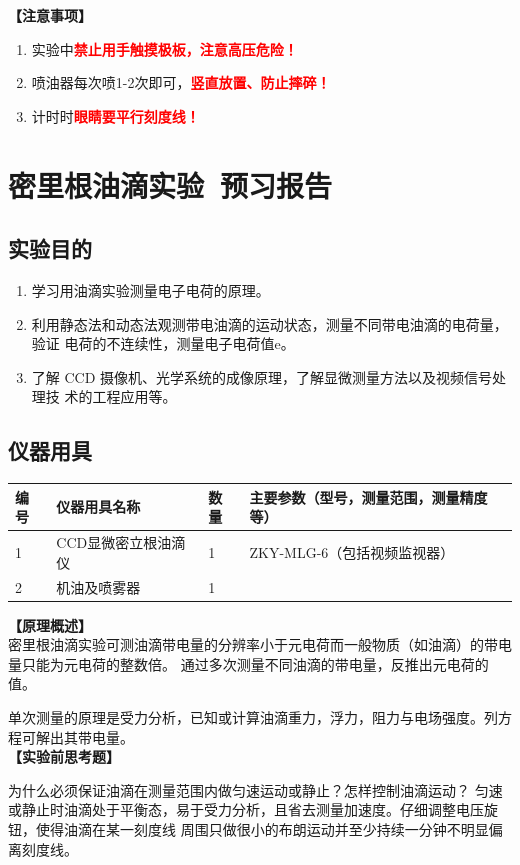 \documentclass[dvipsnames, svgnames,a4paper,11pt]{article}
\begin{document}
{\textbf{【注意事项】}
\begin{enumerate}
	\item 实验中\textbf{\textcolor{red}{禁止用手触摸极板，注意高压危险！}}
	\item 喷油器每次喷1-2次即可，\textbf{\textcolor{red}{竖直放置、防止摔碎！}}
	\item 计时时\textbf{\textcolor{red}{眼睛要平行刻度线！}}
    
\end{enumerate}}

\clearpage
\tableofcontents
\clearpage

\setcounter{section}{0}
\section{密里根油滴实验\ \textbf{预习报告}}
	
\subsection{实验目的}
\begin{enumerate}
	\item 学习用油滴实验测量电子电荷的原理。
	\item 利用静态法和动态法观测带电油滴的运动状态，测量不同带电油滴的电荷量，验证
	电荷的不连续性，测量电子电荷值e。 
	\item 了解 CCD 摄像机、光学系统的成像原理，了解显微测量方法以及视频信号处理技
	术的工程应用等。
\end{enumerate}

\subsection{仪器用具}
\begin{table}[htbp]
	\centering
	\renewcommand\arraystretch{1.6}
	\begin{tabular}{p{}|p{}|p{}|p{}}
	\hline
	编号& 仪器用具名称 & 数量 &  主要参数（型号，测量范围，测量精度等） \\
	\hline
	1&CCD显微密立根油滴仪 &1 &ZKY-MLG-6（包括视频监视器）\\
	\hline
	2&机油及喷雾器 &1&\\
	\hline
\end{tabular}
\end{table}

\textbf{【原理概述】}\\
密里根油滴实验可测油滴带电量的分辨率小于元电荷而一般物质（如油滴）的带电量只能为元电荷的整数倍。
通过多次测量不同油滴的带电量，反推出元电荷的值。\par
单次测量的原理是受力分析，已知或计算油滴重力，浮力，阻力与电场强度。列方程可解出其带电量。\\
\textbf{【实验前思考题】}\\
\begin{question}
	为什么必须保证油滴在测量范围内做匀速运动或静止？怎样控制油滴运动？
	\tcblower
	匀速或静止时油滴处于平衡态，易于受力分析，且省去测量加速度。仔细调整电压旋钮，使得油滴在某一刻度线
	周围只做很小的布朗运动并至少持续一分钟不明显偏离刻度线。
\end{question}
\end{document}
